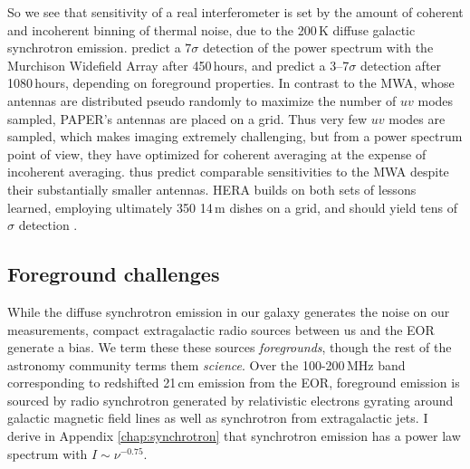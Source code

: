 So we see that sensitivity of a real interferometer is set by the amount of coherent and incoherent binning of thermal noise, due to the 200\,K diffuse galactic synchrotron emission.  \citet{beardsley13} predict a $7\sigma$ detection of the power spectrum with the Murchison Widefield Array after 450\,hours, and \citet{PoberNextGen} predict a 3--7$\sigma$ detection after 1080\,hours, depending on foreground properties. In contrast to the MWA, whose antennas are distributed pseudo randomly to maximize the number of $uv$ modes sampled, PAPER's antennas are placed on a grid. Thus very few $uv$ modes are sampled, which makes imaging extremely challenging, but from a power spectrum point of view, they have optimized for coherent averaging at the expense of incoherent averaging. \citet{PoberNextGen} thus predict comparable sensitivities to the MWA despite their substantially smaller antennas. HERA builds on both sets of lessons learned, employing ultimately 350 14\,m dishes on a grid, and should yield tens of $\sigma$ detection \citet{neben16b,ewallwice16,nithya16,PoberNextGen,patra16}. 

\subsection{Foreground challenges}
\label{sec:foregroundchallenges}
While the diffuse synchrotron emission in our galaxy generates the noise on our measurements, compact extragalactic radio sources between us and the EOR generate a bias. We term these these sources \textit{foregrounds}, though the rest of the astronomy community terms them \textit{science}. Over the 100-200\,MHz band corresponding to redshifted 21\,cm emission from the EOR, foreground emission is sourced by radio synchrotron generated by relativistic electrons gyrating around galactic magnetic field lines as well as synchrotron from extragalactic jets. I derive in Appendix \ref{chap:synchrotron} that synchrotron emission has a power law spectrum with $I\sim\nu^{-0.75}$.

